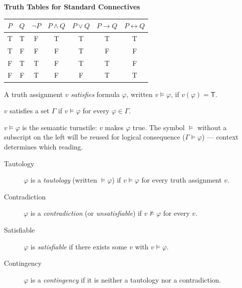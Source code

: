 \begin{center}
\small\textbf{Truth Tables for Standard Connectives}

\vspace{0.5em}
\renewcommand{\arraystretch}{1.2}
\begin{tabular}{cc|ccccc}
\toprule
$P$ & $Q$ & $\neg P$ & $P \wedge Q$ & $P \vee Q$ & $P \rightarrow Q$ & $P \leftrightarrow Q$ \\
\midrule
T & T & F & T & T & T & T \\
T & F & F & F & T & F & F \\
F & T & T & F & T & T & F \\
F & F & T & F & F & T & T \\
\bottomrule
\end{tabular}
\end{center}

\begin{tcolorbox}[colback=propbox, colframe=propborder, arc=2pt,
  left=6pt, right=6pt, top=4pt, bottom=4pt,
  title={\small\textbf{Definition (Satisfaction)}},
  fonttitle=\small\bfseries]
\label{def:pl-satisfaction}
A truth assignment $v$ \emph{satisfies} formula $\varphi$, written
$v \models \varphi$, if $v(\varphi) = \mathsf{T}$.

$v$ satisfies a set $\Gamma$ if $v \models \varphi$ for every $\varphi \in \Gamma$.
\end{tcolorbox}

\begin{remark}[Intuition]
$v \models \varphi$ is the semantic turnstile: $v$ makes $\varphi$ true.
The symbol $\models$ without a subscript on the left will be reused for
logical consequence ($\Gamma \models \varphi$) — context determines which reading.
\end{remark}

\begin{tcolorbox}[colback=propbox, colframe=propborder, arc=2pt,
  left=6pt, right=6pt, top=4pt, bottom=4pt,
  title={\small\textbf{Definitions (Formula Classification)}},
  fonttitle=\small\bfseries]
\begin{description}
  \item[Tautology\label{def:tautology}] $\varphi$ is a \emph{tautology} (written $\models\varphi$)
    if $v \models \varphi$ for every truth assignment $v$.
  \item[Contradiction\label{def:contradiction}] $\varphi$ is a \emph{contradiction} (or \emph{unsatisfiable})
    if $v \not\models \varphi$ for every $v$.
  \item[Satisfiable\label{def:satisfiable}] $\varphi$ is \emph{satisfiable} if there exists some $v$ with $v \models \varphi$.
  \item[Contingency\label{def:contingency}] $\varphi$ is a \emph{contingency} if it is neither a tautology nor a contradiction.
\end{description}
\end{tcolorbox}

